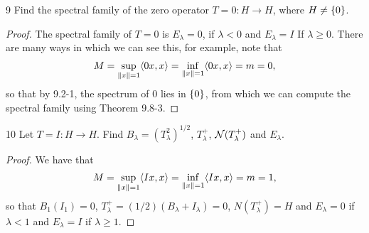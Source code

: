 \begin{exercise}{9}
Find the spectral family of the zero operator $T = 0: H \to H$, where $H \neq \{0\}$.
\end{exercise}
\begin{proof}
The spectral family of $T = 0$ is $E_\lambda = 0$, if $\lambda < 0$ and $E_\lambda = I$ If $\lambda \geq 0$.
There are many ways in which we can see this, for example, note that 
\begin{align*}
    M = \sup_{\left\lVert x\right\rVert = 1} \langle 0x, x\rangle 
    = \inf_{\left\lVert x\right\rVert = 1} \langle 0x, x\rangle = m 
    = 0,
\end{align*}
so that by 9.2-1, the spectrum of 0 lies in $\{0\}$, from which we can compute the spectral family using Theorem 9.8-3.
\end{proof} 

\begin{exercise}{10}
Let $T = I: H \to H$.
Find $B_\lambda = (T^2_\lambda)^{1/2}$, $T^+_\lambda$, $\mathcal{N}(T^+_\lambda)$ and $E_\lambda$.
\end{exercise}
\begin{proof}
We have that 
\begin{align*}
    M = \sup_{\left\lVert x\right\rVert = 1} \langle Ix, x\rangle 
    = \inf_{\left\lVert x\right\rVert = 1} \langle Ix, x\rangle = m 
    = 1,
\end{align*}
so that $B_1(I_1) = 0$, $T_\lambda^+ = (1/2) (B_\lambda + I_\lambda) = 0$, $N(T_\lambda^+) = H$ and $E_\lambda = 0$ if $\lambda < 1$ and $E_\lambda = I$ if $\lambda \geq 1$.
\end{proof} 
